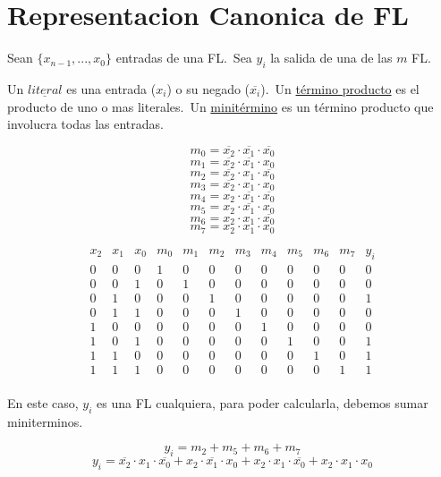 \documentclass{report}
\begin{document}
\section{Representacion Canonica de FL}


Sean $\{x_{n-1},...,x_0\}$ entradas de una FL.\
Sea $y_i$ la salida de una de las $m$ FL.

Un $\underline{literal}$ es una entrada ($x_i$) o su negado ($\overline{x_i}$).\
Un \underline{término producto} es el producto de uno o mas literales.\
Un \underline{minitérmino} es un término producto que involucra todas las entradas.

$$m_0 = \overline{x_2} \cdot \overline{x_1} \cdot \overline{x_0}$$
$$m_1 = \overline{x_2} \cdot \overline{x_1} \cdot x_0$$
$$m_2 = \overline{x_2} \cdot x_1  \cdot \overline{x_0}$$
$$m_3 = \overline{x_2} \cdot x_1  \cdot x_0$$
$$m_4 = x_2  \cdot \overline{x_1} \cdot \overline{x_0}$$
$$m_5 = x_2  \cdot \overline{x_1} \cdot x_0$$
$$m_6 = x_2  \cdot x_1  \cdot \overline{x_0}$$
$$m_7 = x_2  \cdot x_1  \cdot x_0$$

$$\begin{array}{ccc|cccccccc|c}
		x_2 & x_1 & x_0 & m_0 & m_1 & m_2 & m_3 & m_4 & m_5 & m_6 & m_7 & y_i \\ \hline
		0   & 0   & 0   & 1   & 0   & 0   & 0   & 0   & 0   & 0   & 0   & 0   \\
		0   & 0   & 1   & 0   & 1   & 0   & 0   & 0   & 0   & 0   & 0   & 0   \\
		0   & 1   & 0   & 0   & 0   & 1   & 0   & 0   & 0   & 0   & 0   & 1   \\
		0   & 1   & 1   & 0   & 0   & 0   & 1   & 0   & 0   & 0   & 0   & 0   \\
		1   & 0   & 0   & 0   & 0   & 0   & 0   & 1   & 0   & 0   & 0   & 0   \\
		1   & 0   & 1   & 0   & 0   & 0   & 0   & 0   & 1   & 0   & 0   & 1   \\
		1   & 1   & 0   & 0   & 0   & 0   & 0   & 0   & 0   & 1   & 0   & 1   \\
		1   & 1   & 1   & 0   & 0   & 0   & 0   & 0   & 0   & 0   & 1   & 1   \\
	\end{array}$$

En este caso, $y_i$ es una FL cualquiera, para poder calcularla, debemos sumar miniterminos.

$$y_i = m_2 + m_5 + m_6 + m_7 $$
$$y_i = \overline{x_2} \cdot x_1 \cdot \overline{x_0} + x_2 \cdot \overline{x_1} \cdot x_0 + x_2 \cdot x_1 \cdot \overline{x_0} + x_2 \cdot x_1 \cdot x_0$$
\end{document}
